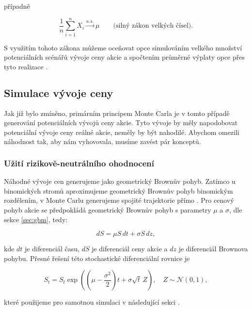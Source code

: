 \documentclass[male,czech,api_bc]{kitheses}
\begin{document}
  případně

  \begin{equation}
    \label{eq:strong_big_numbers}
    \frac{1}{n}\sum_{i=1}^n X_i \xrightarrow{a.s.} \mu \qquad\text{(silný zákon velkých čísel)}.
  \end{equation}

  S využitím tohoto zákona můžeme oceňovat opce simulováním velkého množství potenciálních scénářů vývoje ceny akcie a spočtením průměrné výplaty opce přes tyto realizace \parencites[kapitoly~8.2,8.4]{Ross2019}.

  \subsection{Simulace vývoje ceny}

  Jak již bylo zmíněno, primárním principem Monte Carla je v tomto případě generování potenciálních vývojů ceny akcie. Tyto vývoje by měly napodobovat potenciální vývoje ceny reálné akcie, neměly by být nahodilé. Abychom omezili náhodnost tak, aby nám vyhovovala, musíme zavést pár konceptů.

  \subsubsection{Užití rizikově-neutrálního ohodnocení}

  Náhodné vývoje cen generujeme jako geometrický Brownův pohyb. Zatímco u binomických stromů aproximujeme geometrický Brownův pohyb binomickým rozdělením, v Monte Carlu generujeme spojité trajektorie přímo \parencites[kapitola~80.2]{Wilmott2006}. Pro cenový pohyb akcie se předpokládá geometrický Brownův pohyb s parametry $\mu$ a $\sigma$, dle sekce \ref{sec:gbm}, tedy:

  \begin{equation}
    dS = \mu S \, dt + \sigma S \, dz,
  \end{equation}

  kde $dt$ je diferenciál času, $dS$ je diferenciál ceny akcie a $dz$ je diferenciál Brownova pohybu. Přesné řešení této stochastické diferenciální rovnice je

  \begin{equation}
    S_t = S_t \exp\!\left( (\mu - \frac{\sigma^2}{2}) t + \sigma \sqrt{t} \, Z \right), \quad Z \sim \mathcal{N}(0,1), \label{eq:exact_gbm}
  \end{equation}

  které použijeme pro samotnou simulaci v následující sekci \parencites[kapitola~1.1]{Glasserman2004}.
\end{document}
